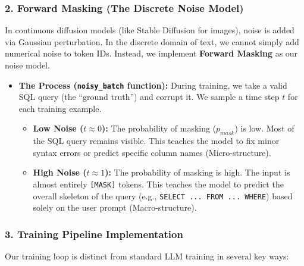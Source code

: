 \documentclass[a4paper,12pt]{article}
\begin{document}
\subsubsection{2. Forward Masking (The Discrete Noise Model)}

In continuous diffusion models (like Stable Diffusion for images), noise is added via Gaussian perturbation. In the discrete domain of text, we cannot simply add numerical noise to token IDs. Instead, we implement \textbf{Forward Masking} as our noise model.

\begin{itemize}
    \item \textbf{The Process (\texttt{noisy\_batch} function):} During training, we take a valid SQL query (the ``ground truth'') and corrupt it. We sample a time step $t$ for each training example.
    \begin{itemize}
        \item \textbf{Low Noise ($t \approx 0$):} The probability of masking ($p_{mask}$) is low. Most of the SQL query remains visible. This teaches the model to fix minor syntax errors or predict specific column names (Micro-structure).
        \item \textbf{High Noise ($t \approx 1$):} The probability of masking is high. The input is almost entirely \texttt{[MASK]} tokens. This teaches the model to predict the overall skeleton of the query (e.g., \texttt{SELECT ... FROM ... WHERE}) based solely on the user prompt (Macro-structure).
    \end{itemize}
\end{itemize}

\subsubsection{3. Training Pipeline Implementation}

Our training loop is distinct from standard LLM training in several key ways:
\end{document}
